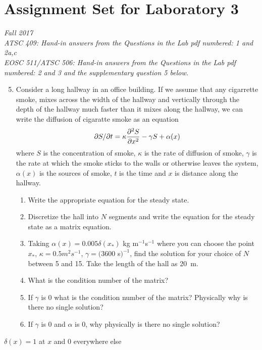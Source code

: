 \documentclass[12pt]{article}
\begin{document}
\section*{Assignment Set for Laboratory 3}
{\it Fall 2017\\
ATSC 409: Hand-in answers from the Questions in the Lab pdf numbered: 1 and 2a,c\\
EOSC 511/ATSC 506: Hand-in answers from the Questions in the Lab pdf
numbered: 2 and 3 and the supplementary question 5 below.}

\begin{enumerate}
\setcounter{enumi}{4}
\item Consider a long hallway in an office building.  If we assume that any cigarrette smoke, mixes across the width of the hallway and vertically through the depth of the hallway much faster than it mixes along the hallway, we can write the diffusion of cigaratte smoke as an equation
\[
\partial S/\partial t = \kappa \frac {\partial^2 S}{\partial x^2} - \gamma S + \alpha(x)
\]
where $S$ is the concentration of smoke, $\kappa$ is the rate of diffusion of smoke, $\gamma$ is the rate at which the smoke sticks to the walls or otherwise leaves the system, $\alpha(x)$ is the sources of smoke, $t$ is the time and $x$ is distance along the hallway.
\begin{enumerate}
\item Write the appropriate equation for the steady state.
\item Discretize the hall into $N$ segments and write the equation for the steady state as a matrix equation.
\item Taking $\alpha(x) = 0.005 \delta(x_*)$ kg m$^{-1}$s$^{-1}$ where you can choose the point $x_*$, $\kappa = 0.5 m^2 s^{-1}$, $\gamma = (3600$ s$)^{-1}$, find the solution for your choice of $N$ between 5 and 15.  Take the length of the hall as 20~m.
\item What is the condition number of the matrix?
\item If $\gamma$ is 0 what is the condition number of the matrix?  Physically why is there no single solution?
\item If $\gamma$ is 0 and $\alpha$ is 0, why physically is there no single solution?
\end{enumerate}
\end{enumerate}

$\delta(x) = 1$ at $x$ and $0$ everywhere else


\flushright{{\small \today \hspace{0.1in} \currenttime}}
\end{document}

